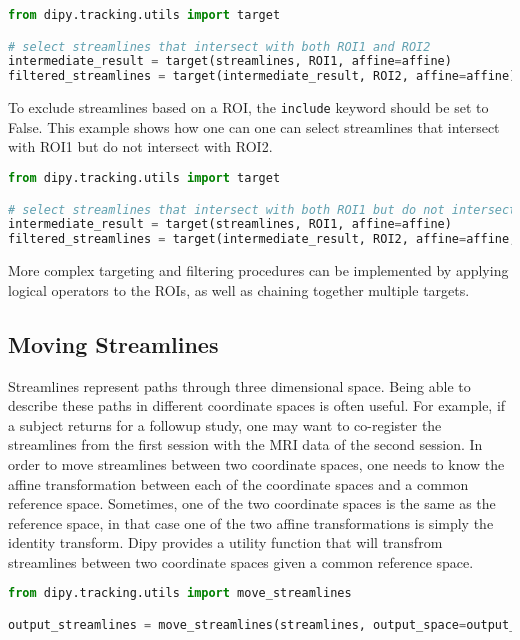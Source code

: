 \begin{lstlisting}[language=python]
from dipy.tracking.utils import target

# select streamlines that intersect with both ROI1 and ROI2
intermediate_result = target(streamlines, ROI1, affine=affine)
filtered_streamlines = target(intermediate_result, ROI2, affine=affine)

\end{lstlisting}

To exclude streamlines based on a ROI, the \verb|include| keyword should be set to False. This example shows how one can one can select streamlines that intersect with ROI1 but do not intersect with ROI2.

\begin{lstlisting}[language=python]
from dipy.tracking.utils import target

# select streamlines that intersect with both ROI1 but do not intersect with ROI2
intermediate_result = target(streamlines, ROI1, affine=affine)
filtered_streamlines = target(intermediate_result, ROI2, affine=affine, include=False)

\end{lstlisting}

More complex targeting and filtering procedures can be implemented by applying logical operators to the ROIs, as well as chaining together multiple targets.

\subsection{Moving Streamlines}

Streamlines represent paths through three dimensional space. Being able to describe these paths in different coordinate spaces is often useful. For example, if a subject returns for a followup study, one may want to co-register the streamlines from the first session with the MRI data of the second session. In order to move streamlines between two coordinate spaces, one needs to know the affine transformation between each of the coordinate spaces and a common reference space. Sometimes, one of the two coordinate spaces is the same as the reference space, in that case one of the two affine transformations is simply the identity transform. Dipy provides a utility function that will transfrom streamlines between two coordinate spaces given a common reference space.

\begin{lstlisting}[language=python]
from dipy.tracking.utils import move_streamlines

output_streamlines = move_streamlines(streamlines, output_space=output_affine, input_space=input_affine)
\end{lstlisting}

